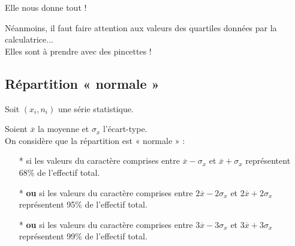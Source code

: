 Elle nous donne tout ! \vspace*{.3cm}

Néanmoins, il faut faire attention aux valeurs des quartiles données par la calculatrice... \\ Elles sont à prendre avec des pincettes !

\vspace*{-5cm}

\newpage

\subsection{Répartition « normale »}

Soit $\left(x_i,n_i\right)$ une série statistique. 

Soient $\overline{x}$ la moyenne et $\sigma_x$ l'écart-type. \\

On considère que la répartition est « normale » : \\

\begin{itemize}
\item[*] si les valeurs du caractère comprises entre $\overline{x} - \sigma_x$ et $\overline{x} + \sigma_x$ représentent 68\% de l'effectif total.
\item[*] \textbf{ou} si les valeurs du caractère comprises entre $2\overline{x} - 2\sigma_x$ et $2\overline{x} + 2\sigma_x$ représentent 95\% de l'effectif total.
\item[*] \textbf{ou} si les valeurs du caractère comprises entre $3\overline{x} - 3\sigma_x$ et $3\overline{x} + 3\sigma_x$ représentent 99\% de l'effectif total.
\end{itemize}

\vspace*{.3cm}



